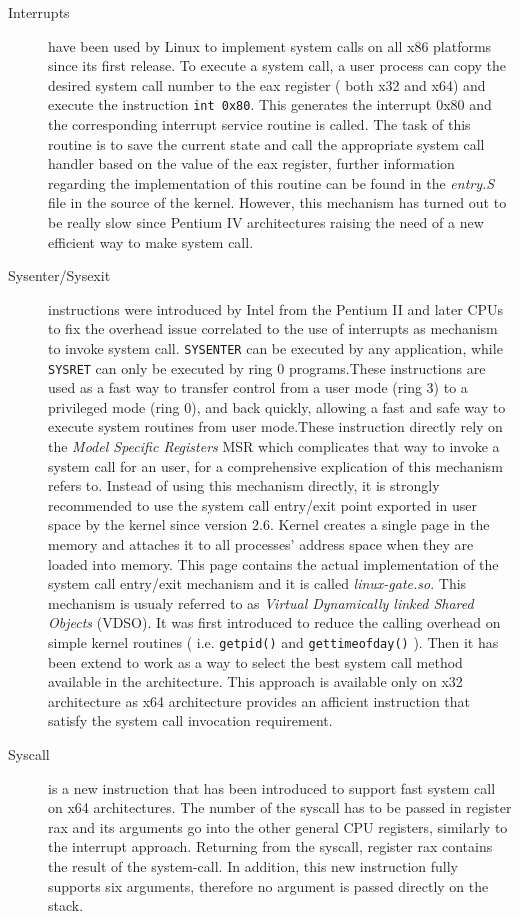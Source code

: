 \begin{description}

\item[Interrupts] have been used by Linux to implement system calls on all x86 platforms since its first release. To execute a system call, a user process can copy the desired system call number to the eax register ( both x32 and x64) and execute the instruction \lstinline$int 0x80$. This generates the interrupt 0x80 and the corresponding interrupt service routine is called. The task of this routine is to save the current state and call the appropriate system call handler based on the value of the eax register, further information regarding the implementation of this routine can be found in the \emph{entry.S} file in the source of the kernel. However, this mechanism has turned out to be really slow since Pentium IV architectures raising the need of a new efficient way to make system call. 

\item[Sysenter/Sysexit] instructions were introduced by Intel from the Pentium II and later CPUs to fix the overhead issue correlated to the use of interrupts as mechanism to invoke system call. \lstinline$SYSENTER$ can be executed by any application, while  \lstinline$SYSRET$ can only be executed by ring 0 programs.These instructions are used as a fast way to transfer control from a user mode (ring 3) to a privileged mode (ring 0), and back quickly, allowing a fast and safe way to execute system routines from user mode.These instruction directly rely on the \textit{Model Specific Registers} MSR which complicates that way to invoke a system call for an user, for a comprehensive explication of this mechanism refers to. Instead of using this mechanism directly, it is strongly recommended to use the system call entry/exit point exported in user space by the kernel since version 2.6. Kernel creates a single page in the memory and attaches it to all processes' address space when they are loaded into memory. This page contains the actual implementation of the system call entry/exit mechanism and it is called \emph{linux-gate.so}. This mechanism is usualy referred to as  \textit{Virtual Dynamically linked Shared Objects} (VDSO). It was first introduced to reduce the calling overhead on simple kernel routines ( i.e. \lstinline$getpid()$ and \lstinline$gettimeofday()$ ). Then it has been extend to work as a way to select the best system call method available in the architecture. This approach is available only on x32 architecture as x64 architecture  provides an afficient instruction that satisfy the system call invocation requirement.  

\item[Syscall] is a new instruction that has been introduced to support fast system call on x64 architectures. The number of the syscall has to be passed in register rax and its arguments go into the other general CPU registers, similarly to the interrupt approach. Returning from the syscall, register rax contains the result of the system-call. In addition, this new instruction fully supports six arguments, therefore no argument is passed directly on the stack.

\end{description} 

